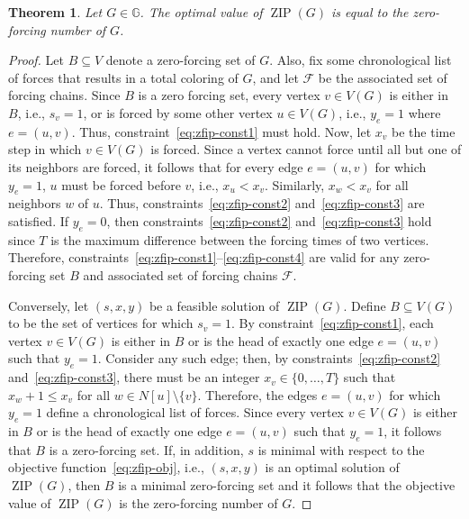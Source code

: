 \documentclass{article}
\newtheorem{theorem}{Theorem}[section]
\theoremstyle{definition}
\newcommand\zip[1]{\operatorname{ZIP}\left(#1\right)}
\begin{document}
\begin{theorem}\label{thm:zfip}
Let $G\in\mathbb{G}$.
The optimal value of $\zip{G}$ is equal to the zero-forcing number of $G$.
\end{theorem}
\begin{proof}
Let $B\subseteq V$ denote a zero-forcing set of $G$.
Also, fix some chronological list of forces that results in a total coloring of $G$, and let $\mathcal{F}$ be the associated set of forcing chains. 
Since $B$ is a zero forcing set, every vertex $v\in V(G)$ is either in $B$, i.e., $s_{v}=1$, or is forced by some other vertex $u\in V(G)$, i.e., $y_{e}=1$ where $e=(u,v)$.
Thus, constraint~\eqref{eq:zfip-const1} must hold.
Now, let $x_{v}$ be the time step in which $v\in V(G)$ is forced. 
Since a vertex cannot force until all but one of its neighbors are forced, it follows that for every edge $e = (u,v)$ for which $y_{e}=1$, $u$ must be forced before $v$, i.e., $x_{u}<x_{v}$. 
Similarly, $x_{w}<x_{v}$ for all neighbors $w$ of $u$. 
Thus, constraints~\eqref{eq:zfip-const2} and~\eqref{eq:zfip-const3} are satisfied.
If $y_{e}=0$, then constraints~\eqref{eq:zfip-const2} and~\eqref{eq:zfip-const3} hold since $T$ is the maximum difference between the forcing times of two vertices. 
Therefore, constraints~\eqref{eq:zfip-const1}--\eqref{eq:zfip-const4} are valid for any zero-forcing set $B$ and associated set of forcing chains $\mathcal{F}$.

Conversely, let $(s,x,y)$ be a feasible solution of $\zip{G}$.
Define $B\subseteq V(G)$ to be the set of vertices for which $s_{v}=1$. 
By constraint~\eqref{eq:zfip-const1}, each vertex $v\in V(G)$ is either in $B$ or is the head of exactly one edge $e = (u,v)$ such that $y_{e}=1$.
Consider any such edge; then, by constraints~\eqref{eq:zfip-const2} and~\eqref{eq:zfip-const3}, there must be an integer $x_{v}\in\{0,\ldots,T\}$ such that $x_{w}+1\leq x_{v}$ for all $w\in N[u]\setminus\{v\}$. 
Therefore, the edges $e=(u,v)$ for which $y_{e}=1$ define a chronological list of forces.
Since every vertex $v\in V(G)$ is either in $B$ or is the head of exactly one edge $e = (u,v)$ such that $y_{e}=1$, it follows that $B$ is a zero-forcing set. 
If, in addition, $s$ is minimal with respect to the objective function~\eqref{eq:zfip-obj}, i.e., $(s,x,y)$ is an optimal solution of $\zip{G}$, then $B$ is a minimal zero-forcing set and it follows that the objective value of $\zip{G}$ is the zero-forcing number of $G$.
\end{proof}

\label{Bibliography}


\end{document}
